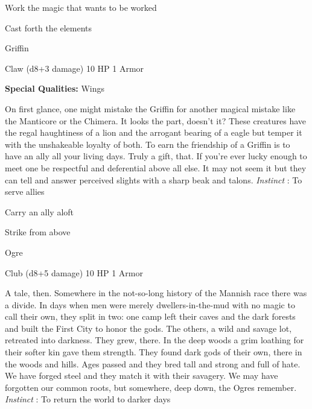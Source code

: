\startitemize[1,packed]
         
\item Work the magic that wants to be worked

         
\item Cast forth the elements

       
\stopitemize
       
\startMonsterName
Griffin	 
\stopMonsterName
       

Claw (d8+3 damage)	10 HP	1 Armor

       


       
\startMonsterQualities
         {\bf Special Qualities:}  Wings
\stopMonsterQualities
       
\startMonsterDescription
On first glance, one might mistake the Griffin for another magical mistake like the Manticore or the Chimera. It looks the part, doesn’t it? These creatures have the regal haughtiness of a lion and the arrogant bearing of a eagle but temper it with the unshakeable loyalty of both. To earn the friendship of a Griffin is to have an ally all your living days. Truly a gift, that. If you’re ever lucky enough to meet one be respectful and deferential above all else. It may not seem it but they can tell and answer perceived slights with a sharp beak and talons. {\em Instinct} : To serve allies
\stopMonsterDescription
       
\startitemize[1,packed]
         
\item Carry an ally aloft

         
\item Strike from above

       
\stopitemize
       
\startMonsterName
Ogre	 
\stopMonsterName
       

Club (d8+5 damage)	10 HP	1 Armor

       


       
\startMonsterDescription
A tale, then. Somewhere in the not-so-long history of the Mannish race there was a divide. In days when men were merely dwellers-in-the-mud with no magic to call their own, they split in two: one camp left their caves and the dark forests and built the First City to honor the gods. The others, a wild and savage lot, retreated into darkness. They grew, there. In the deep woods a grim loathing for their softer kin gave them strength. They found dark gods of their own, there in the woods and hills. Ages passed and they bred tall and strong and full of hate. We have forged steel and they match it with their savagery. We may have forgotten our common roots, but somewhere, deep down, the Ogres remember. {\em Instinct} : To return the world to darker days
\stopMonsterDescription
       
